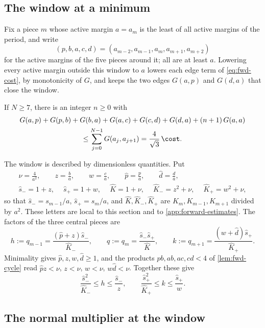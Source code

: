 \subsection{The window at a minimum}

Fix a piece $m$ whose active margin $a=a_m$ is the least of all active margins of the period, and
write
\[
(p,b,a,c,d)=(a_{m-2},a_{m-1},a_m,a_{m+1},a_{m+2})
\]
for the active margins of the five pieces around it; all are at least $a$. Lowering every active
margin outside this window to $a$ lowers each edge term of \eqref{eq:fwd-cost}, by monotonicity of
$G$, and keeps the two edges $G(a,p)$ and $G(d,a)$ that close the window.

\begin{lemma}\label{lem:fwd-seven}
If $N\ge7$, there is an integer $n\ge0$ with
\begin{multline*}
G(a,p)+G(p,b)+G(b,a)+G(a,c)+G(c,d)+G(d,a)+(n+1)\,G(a,a)\\
\le\sum_{j=0}^{N-1}G(a_j,a_{j+1})=\frac{4}{\sqrt3}\,\cost .
\end{multline*}
\end{lemma}

The window is described by dimensionless quantities. Put
\begin{gather*}
\nu=\frac4{a^2},\qquad z=\frac ba,\qquad w=\frac ca,\qquad \hat p=\frac pa,\qquad \hat d=\frac da,\\
\hat s_-=1+z,\quad\ \hat s_+=1+w,\quad\ \hat K=1+\nu,\quad\ \hat K_-=z^2+\nu,\quad\ \hat K_+=w^2+\nu,
\end{gather*}
so that $\hat s_-=s_{m-1}/a$, $\hat s_+=s_m/a$, and $\hat K,\hat K_-,\hat K_+$ are
$K_m,K_{m-1},K_{m+1}$ divided by $a^2$. These letters are local to this section and to
\cref{app:forward-estimates}. The factors of the three central pieces are
\[
h:=q_{m-1}=\frac{(\hat p+z)\hat s_-}{\hat K_-},\qquad
q:=q_m=\frac{\hat s_-\hat s_+}{\hat K},\qquad
k:=q_{m+1}=\frac{(w+\hat d)\hat s_+}{\hat K_+}.
\]
Minimality gives $\hat p,z,w,\hat d\ge1$, and the products $pb,ab,ac,cd<4$ of
\cref{lem:fwd-cycle} read $\hat pz<\nu$, $z<\nu$, $w<\nu$, $w\hat d<\nu$. Together these give
\begin{equation}\label{eq:fwd-factor-range}
\frac{\hat s_-^2}{\hat K_-}\le h\le\frac{\hat s_-}{z},\qquad
\frac{\hat s_+^2}{\hat K_+}\le k\le\frac{\hat s_+}{w}.
\end{equation}

\subsection{The normal multiplier at the window}

